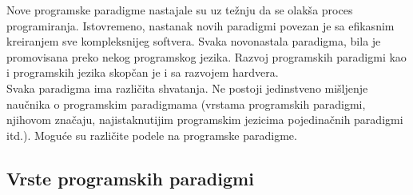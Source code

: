 \documentclass[../main.tex]{subfiles}
\begin{document}
Nove programske paradigme nastajale su uz težnju da se olakša proces programiranja. Istovremeno, nastanak novih paradigmi povezan je sa efikasnim kreiranjem sve kompleksnijeg softvera. Svaka novonastala paradigma, bila je promovisana preko nekog programskog jezika. Razvoj programskih paradigmi kao i programskih jezika skopčan je i sa razvojem hardvera. \\
Svaka paradigma ima različita shvatanja. Ne postoji jedinstveno mišljenje naučnika o programskim paradigmama (vrstama programskih paradigmi, njihovom značaju, najistaknutijim programskim jezicima pojedinačnih paradigmi itd.). Moguće su različite podele na programske paradigme.

\subsection{Vrste programskih paradigmi}										
\end{document}
